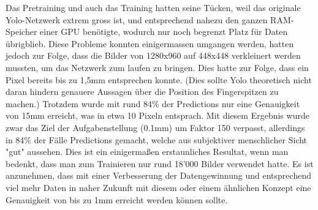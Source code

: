 Das Pretraining und auch das Training hatten seine Tücken, weil das originale Yolo-Netzwerk extrem gross ist, und entsprechend nahezu den ganzen RAM-Speicher einer GPU benötigte, wodurch nur noch begrenzt Platz für Daten übrigblieb. 
Diese Probleme konnten einigermassen umgangen werden, hatten jedoch zur Folge, dass die Bilder von 1280x960 auf 448x448 verkleinert werden mussten, um das Netzwerk zum laufen zu bringen. 
Dies hatte zur Folge, dass ein Pixel bereits bis zu 1,5mm entsprechen konnte. (Dies sollte Yolo theoretisch nicht daran hindern genauere Aussagen über die Position des Fingerspitzen zu machen.) 
Trotzdem wurde mit rund 84\% der Predictions nur eine Genauigkeit von 15mm erreicht, was in etwa 10 Pixeln entsprach. 
Mit diesem Ergebnis wurde zwar das Ziel der Aufgabenstellung (0.1mm) um Faktor 150 verpasst, allerdings in 84\% der Fälle Predictions gemacht, welche aus subjektiver menschlicher Sicht "gut" aussehen. 
Dies ist ein einigermaßen erstaunliches Resultat, wenn man bedenkt, dass man zum Trainieren nur rund 18'000 Bilder verwendet hatte. 
Es ist anzunehmen, dass mit einer Verbesserung der Datengewinnung und entsprechend viel mehr Daten in naher Zukunft mit diesem oder einem ähnlichen Konzept eine Genauigkeit von bis zu 1mm erreicht werden können sollte.
